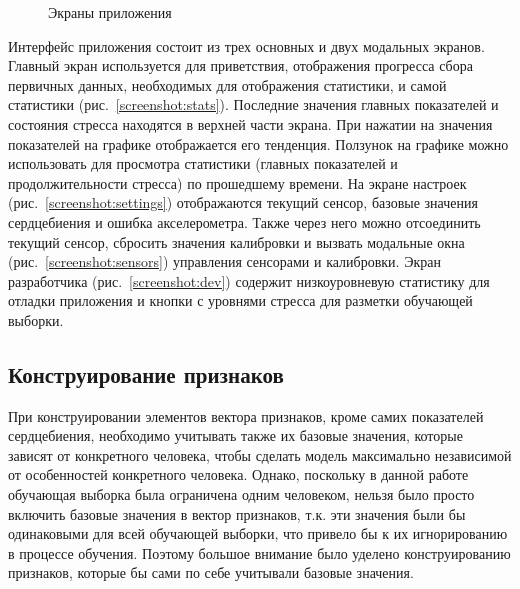 \documentclass[14pt]{matmex-diploma-custom}
\begin{document}
\begin{figure}[htp]
\begin{center}
{      \label{screenshot:sensors}
    } 
  \end{center}
	\caption{Экраны приложения}
	\label{screenshots}
\end{figure}

Интерфейс приложения состоит из трех основных и двух модальных экранов. Главный
экран используется для приветствия, отображения прогресса сбора первичных
данных, необходимых для отображения статистики, и самой статистики
(рис.~\ref{screenshot:stats}). Последние значения главных показателей и
состояния стресса находятся в верхней части экрана. При нажатии на значения
показателей на графике отображается его тенденция. Ползунок на графике можно
использовать для просмотра статистики (главных показателей и продолжительности
стресса) по прошедшему времени. На экране настроек
(рис.~\ref{screenshot:settings}) отображаются текущий сенсор, базовые значения
сердцебиения и ошибка акселерометра. Также через него можно отсоединить текущий
сенсор, сбросить значения калибровки и вызвать модальные окна
(рис.~\ref{screenshot:sensors}) управления сенсорами и калибровки. Экран
разработчика (рис.~\ref{screenshot:dev}) содержит низкоуровневую статистику для
отладки приложения и кнопки с уровнями стресса для разметки обучающей выборки.

\subsection{Конструирование признаков}
При конструировании элементов вектора признаков, кроме самих показателей
сердцебиения, необходимо учитывать также их базовые значения, которые зависят от
конкретного человека, чтобы сделать модель максимально независимой от
особенностей конкретного человека. Однако, поскольку в данной работе обучающая
выборка была ограничена одним человеком, нельзя было просто включить базовые
значения в вектор признаков, т.к. эти значения были бы одинаковыми для всей
обучающей выборки, что привело бы к их игнорированию в процессе обучения.
Поэтому большое внимание было уделено конструированию признаков, которые бы сами
по себе учитывали базовые значения.
\end{document}
